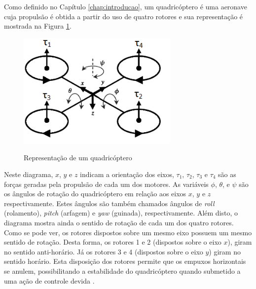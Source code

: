 Como definido no Capítulo \ref{chap:introducao}, um quadricóptero é uma aeronave cuja propulsão é obtida a partir do uso de quatro rotores e sua representação é mostrada na Figura \ref{fig:drone_diagram}. 


\begin{figure}[!htb]
    \centering
    \caption{Representação de um quadricóptero}
    \includegraphics[width=0.7\textwidth]{./04-figuras/drone_diagram/drone_gray_separate1_white_adapted}
    \label{fig:drone_diagram}
\end{figure}

Neste diagrama, $x$, $y$ e $z$ indicam a orientação dos eixos, $\tau_1$, $\tau_2$, $\tau_3$ e $\tau_4$ são as forças geradas pela propulsão de cada um dos motores. As variáveis $\phi$, $\theta$, e $\psi$ são os ângulos de rotação do quadricóptero em relação aos eixos $x$, $y$ e $z$ respectivamente. Estes ângulos são também chamados ângulos de \textit{roll} (rolamento), \textit{pitch} (arfagem) e \textit{yaw} (guinada), respectivamente. Além disto, o diagrama mostra ainda o sentido de rotação de cada um dos quatro rotores. Como se pode ver, os rotores dispostos sobre um mesmo eixo possuem um mesmo sentido de rotação. Desta forma, os rotores 1 e 2 (dispostos sobre o eixo $x$), giram no sentido anti-horário. Já os rotores 3 e 4 (dispostos sobre o eixo $y$) giram no sentido horário. Esta disposição dos rotores permite que os empuxos horizontais se anulem, possibilitando a estabilidade do quadricóptero quando submetido a uma ação de controle devida \cite[p.~1]{Ariffanan2014}.


